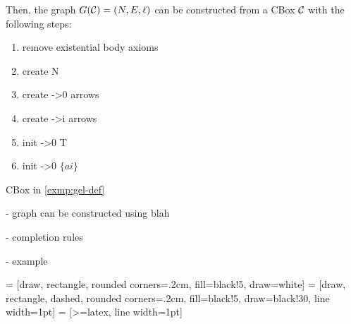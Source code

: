 Then, the graph $G(\mathcal{C}) = (N, E, \ell)$ can be constructed from a CBox $\mathcal{C}$ with the following steps:
\begin{enumerate}
	\item remove existential body axioms
	\item create N
	\item create ->0 arrows
	\item create ->i arrows
	\item init ->0 T
	\item init ->0 $\{ai\}$
\end{enumerate}

\begin{example}
	CBox in \autoref{exmp:gel-def}
\end{example}
- graph can be constructed using blah

- completion rules

- example



 = [draw, rectangle, rounded corners=.2cm, fill=black!5, draw=white]
 = [draw, rectangle, dashed, rounded corners=.2cm, fill=black!5, draw=black!30, line width=1pt]
 = [>=latex, line width=1pt]

